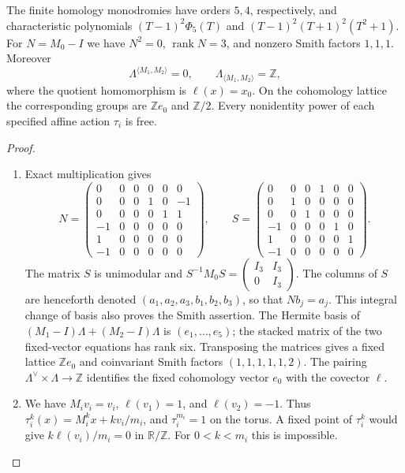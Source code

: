 \begin{theorem}\hypertarget{tag-02QI}{}\label{night:P1.1}
The finite homology monodromies have orders $5,4$, respectively, and
characteristic polynomials
$(T-1)^2\Phi _5(T)$ and $(T-1)^2(T+1)^2(T^2+1)$.
For $N=M_0-I$ we have $N^2=0$, $\operatorname{rank}N=3$, and
nonzero Smith factors $1,1,1$.  Moreover
\[
 \Lambda^{\langle M_1,M_2\rangle}=0,\qquad
 \Lambda_{\langle M_1,M_2\rangle}=\mathbb Z,
\]
where the quotient homomorphism is $\ell(x)=x_0$.
On the cohomology lattice the corresponding groups are $\mathbb Ze_0$
and $\mathbb Z/2$.  Every nonidentity power of each specified affine
action $\tau_i$ is free.
\end{theorem}
\begin{proof}
\begin{enumerate}[label={$\langle1\rangle$\arabic*.}]
\item Exact multiplication gives
\[
N=\begin{pmatrix}
0&0&0&0&0&0\\0&0&0&1&0&-1\\0&0&0&0&1&1\\
-1&0&0&0&0&0\\1&0&0&0&0&0\\-1&0&0&0&0&0
\end{pmatrix},\qquad
S=\begin{pmatrix}
0&0&0&1&0&0\\0&1&0&0&0&0\\0&0&1&0&0&0\\
-1&0&0&0&1&0\\1&0&0&0&0&1\\-1&0&0&0&0&0
\end{pmatrix}.
\]
The matrix $S$ is unimodular and
$S^{-1}M_0S=\left(\begin{smallmatrix}I_3&I_3\\0&I_3\end{smallmatrix}\right)$.
The columns of $S$ are henceforth denoted
$(a_1,a_2,a_3,b_1,b_2,b_3)$, so that $Nb_j=a_j$.
This integral change of basis also proves the Smith assertion.
The Hermite basis of
$(M_1-I)\Lambda+(M_2-I)\Lambda$ is $(e_1,\ldots,e_5)$;
the stacked matrix of the two fixed-vector equations has rank six.
Transposing the matrices gives a fixed lattice $\mathbb Ze_0$ and
coinvariant Smith factors $(1,1,1,1,1,2)$.  The pairing
$\Lambda^\vee\times\Lambda\longrightarrow\mathbb Z$ identifies the
fixed cohomology vector $e_0$ with the covector $\ell$.

\item We have $M_iv_i=v_i$, $\ell(v_1)=1$, and $\ell(v_2)=-1$.
Thus $\tau_i^k(x)=M_i^kx+kv_i/m_i$, and $\tau_i^{m_i}=1$ on the
torus.  A fixed point of $\tau_i^k$ would give
$k\ell(v_i)/m_i=0$ in $\mathbb R/\mathbb Z$.  For
$0<k<m_i$ this is impossible.

\end{enumerate}
\end{proof}

